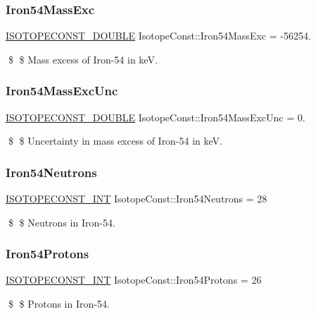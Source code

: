 \subsubsection{\texorpdfstring{Iron54\+Mass\+Exc}{Iron54MassExc}}
{\footnotesize\ttfamily \mbox{\hyperlink{group___isotope_const-_macros_ga8f45a7272ce02c0b4c65c44636ed719a}{I\+S\+O\+T\+O\+P\+E\+C\+O\+N\+S\+T\+\_\+\+D\+O\+U\+B\+LE}} Isotope\+Const\+::\+Iron54\+Mass\+Exc = -\/56254.}

\$ \$ Mass excess of Iron-\/54 in keV. \mbox{\label{group___isotope_const-_iron-_fe54_gadf4a3c9f8ffc119ce45ee90b3c409bbf}} 
\subsubsection{\texorpdfstring{Iron54\+Mass\+Exc\+Unc}{Iron54MassExcUnc}}
{\footnotesize\ttfamily \mbox{\hyperlink{group___isotope_const-_macros_ga8f45a7272ce02c0b4c65c44636ed719a}{I\+S\+O\+T\+O\+P\+E\+C\+O\+N\+S\+T\+\_\+\+D\+O\+U\+B\+LE}} Isotope\+Const\+::\+Iron54\+Mass\+Exc\+Unc = 0.}

\$ \$ Uncertainty in mass excess of Iron-\/54 in keV. \mbox{\label{group___isotope_const-_iron-_fe54_gaf6078120c701617d0e1de718d68d6d88}} 
\subsubsection{\texorpdfstring{Iron54\+Neutrons}{Iron54Neutrons}}
{\footnotesize\ttfamily \mbox{\hyperlink{group___isotope_const-_macros_ga5f18360b3e99483a35c32d789e62621c}{I\+S\+O\+T\+O\+P\+E\+C\+O\+N\+S\+T\+\_\+\+I\+NT}} Isotope\+Const\+::\+Iron54\+Neutrons = 28}

\$ \$ Neutrons in Iron-\/54. \mbox{\label{group___isotope_const-_iron-_fe54_gaa4b9156113b2c8b5f233479f5d965ba8}} 
\subsubsection{\texorpdfstring{Iron54\+Protons}{Iron54Protons}}
{\footnotesize\ttfamily \mbox{\hyperlink{group___isotope_const-_macros_ga5f18360b3e99483a35c32d789e62621c}{I\+S\+O\+T\+O\+P\+E\+C\+O\+N\+S\+T\+\_\+\+I\+NT}} Isotope\+Const\+::\+Iron54\+Protons = 26}

\$ \$ Protons in Iron-\/54. 